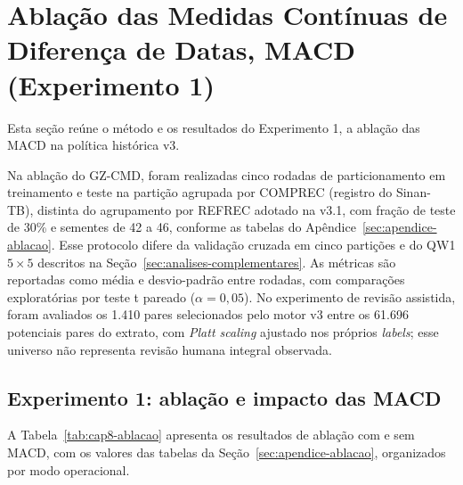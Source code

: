 \section{Ablação das Medidas Contínuas de Diferença de Datas, MACD (Experimento 1)}\label{sec:e4-ap-macd}

Esta seção reúne o método e os resultados do Experimento 1, a ablação das MACD na política histórica v3.

Na ablação do GZ-CMD, foram realizadas cinco rodadas de particionamento em treinamento e teste na partição agrupada por COMPREC (registro do Sinan-TB), distinta do agrupamento por REFREC adotado na v3.1, com fração de teste de 30\% e sementes de 42 a 46, conforme as tabelas do Apêndice~\ref{sec:apendice-ablacao}. Esse protocolo difere da validação cruzada em cinco partições e do QW1 $5 \times 5$ descritos na Seção~\ref{sec:analises-complementares}. As métricas são reportadas como média e desvio-padrão entre rodadas, com comparações exploratórias por teste t pareado ($\alpha=0{,}05$). No experimento de revisão assistida, foram avaliados os 1.410 pares selecionados pelo motor v3 entre os 61.696 potenciais pares do extrato, com \textit{Platt scaling} ajustado nos próprios \textit{labels}; esse universo não representa revisão humana integral observada.

\subsection{Experimento 1: ablação e impacto das MACD}
\label{sec:e4-exp1}

A Tabela~\ref{tab:cap8-ablacao} apresenta os resultados de ablação com e sem MACD, com os valores das tabelas da Seção~\ref{sec:apendice-ablacao}, organizados por modo operacional.

